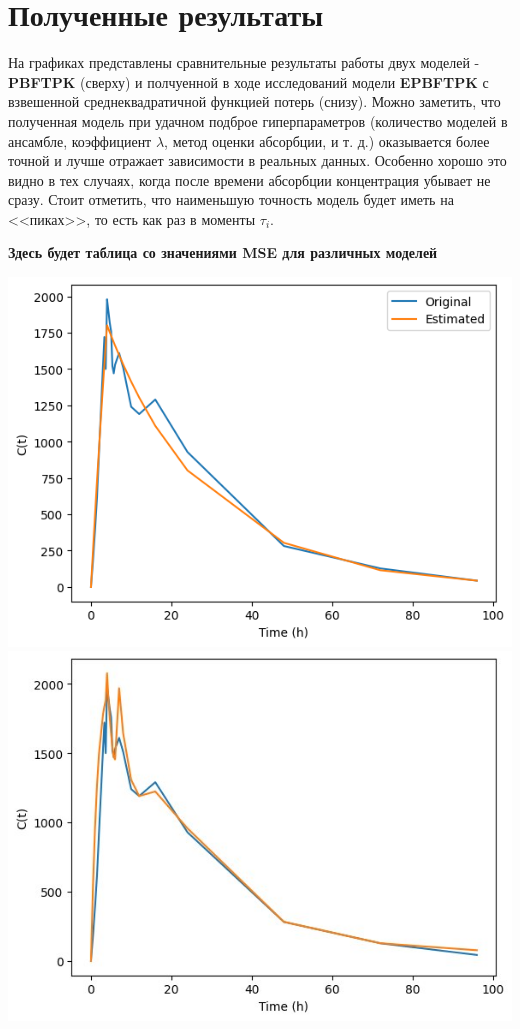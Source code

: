 \documentclass[12pt]{article}
\begin{document}
\newpage

\section{Полученные результаты}

На графиках представлены сравнительные результаты работы двух моделей - \textbf{PBFTPK} (сверху) и полчуенной в ходе исследований модели \textbf{EPBFTPK} с взвешенной среднеквадратичной функцией потерь (снизу). Можно заметить, что полученная модель при удачном подброе гиперпараметров (количество моделей в ансамбле, коэффициент $\lambda$, метод оценки абсорбции, и т. д.) оказывается более точной и лучше отражает зависимости в реальных данных. Особенно хорошо это видно в тех случаях, когда после времени абсорбции концентрация убывает не сразу. Стоит отметить, что наименьшую точность модель будет иметь на <<пиках>>, то есть как раз в моменты $\tau_i$.


\begin{center}
	\textbf{Здесь будет таблица со значениями MSE для различных моделей}
\end{center}

\newpage

\includegraphics{results/basic_1.png}\newline
\includegraphics{results/1.jpg}\newline
\end{document}
